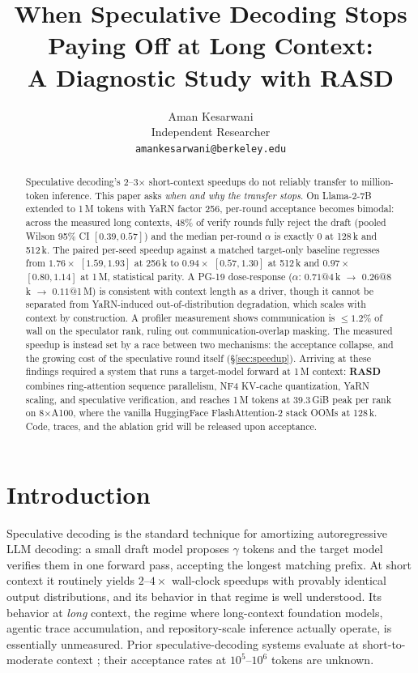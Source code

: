 \documentclass{article}
\author{%
  Aman Kesarwani \\
  Independent Researcher \\
  \texttt{amankesarwani@berkeley.edu} \\
}
\title{When Speculative Decoding Stops Paying Off at Long Context:\\
       A Diagnostic Study with RASD}
\begin{document}
\maketitle

\begin{abstract}
Speculative decoding's 2--3$\times$ short-context speedups do not
reliably transfer to million-token inference. This paper asks \emph{when and
why the transfer stops}. On Llama-2-7B extended to 1\,M tokens with
YaRN factor 256, per-round acceptance becomes bimodal: across the
measured long contexts, 48\% of verify rounds fully reject the draft
(pooled Wilson 95\% CI $[0.39, 0.57]$) and the median per-round
$\alpha$ is exactly 0 at 128\,k and 512\,k. The paired per-seed
speedup against a matched target-only baseline regresses from
$1.76\times$ $[1.59, 1.93]$ at 256\,k to $0.94\times$ $[0.57, 1.30]$
at 512\,k and $0.97\times$ $[0.80, 1.14]$ at 1\,M, statistical
parity. A PG-19 dose-response ($\alpha$: $0.71$@4\,k $\to$ $0.26$@8\,k $\to$
$0.11$@1\,M) is consistent with context length as a driver, though it cannot be separated from YaRN-induced out-of-distribution degradation, which scales with context by construction. A profiler measurement shows communication is
${\leq}1.2\%$ of wall on the speculator rank, ruling out
communication-overlap masking. The measured speedup is instead set
by a race between two mechanisms: the acceptance collapse, and the
growing cost of the speculative round itself (\S\ref{sec:speedup}).
Arriving at these
findings required a system that runs a target-model forward at
1\,M context: \textbf{RASD} combines ring-attention sequence
parallelism, NF4 KV-cache quantization, YaRN scaling, and
speculative verification, and reaches 1\,M tokens at 39.3\,GiB peak
per rank on 8$\times$A100, where the vanilla HuggingFace
FlashAttention-2 stack OOMs at 128\,k. Code, traces, and the
ablation grid will be released upon acceptance.
\end{abstract}

\section{Introduction}
\label{sec:intro}

Speculative decoding \citep{leviathan2023fast,chen2023accelerating}
is the standard technique for amortizing autoregressive LLM
decoding: a small draft model proposes $\gamma$ tokens and the
target model verifies them in one forward pass, accepting the
longest matching prefix. At short context it routinely yields
$2$--$4\times$ wall-clock speedups with provably identical output
distributions, and its behavior in that regime is well understood.
Its behavior at \emph{long} context, the regime where
long-context foundation models, agentic trace accumulation, and
repository-scale inference actually operate, is essentially
unmeasured. Prior speculative-decoding systems evaluate at
short-to-moderate context
\citep{miao2023specinfer,cai2024medusa,li2024eagle}; their
acceptance rates at $10^5$--$10^6$ tokens are unknown.
\end{document}
